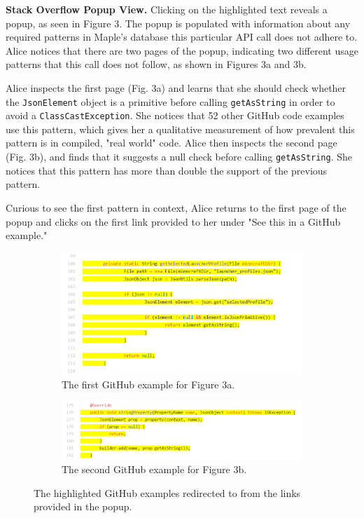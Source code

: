 {\bf Stack Overflow Popup View.}
Clicking on the highlighted text reveals a popup, as seen in Figure 3. The popup is populated with information about any required patterns in Maple's database this particular API call does not adhere to. Alice notices that there are two pages of the popup, indicating two different usage patterns that this call does not follow, as shown in Figures 3a and 3b. 

Alice inspects the first page (Fig. 3a) and learns that she should check whether the {\tt JsonElement} object is a primitive before calling {\tt getAsString} in order to avoid a {\tt ClassCastException}. She notices that 52 other GitHub code examples use this pattern, which gives her a qualitative measurement of how prevalent this pattern is in compiled, "real world" code.
Alice then inspects the second page (Fig. 3b), and finds that it suggests a null check before calling {\tt getAsString}. She notices that this pattern has more than double the support of the previous pattern.

Curious to see the first pattern in context, Alice returns to the first page of the popup and clicks on the first link provided to her under "See this in a GitHub example."

\begin{figure}
\centering
  \begin{subfigure}[a]{0.48\textwidth}
  \includegraphics[width=\textwidth]{json_primitive_gh1.PNG}
  \caption{The first GitHub example for Figure 3a.} 
  \vspace{.1in}
  \label{fig:arch}
  \end{subfigure}
  \hfill
  \begin{subfigure}[b]{0.48\textwidth}
  \includegraphics[width=\textwidth]{json_null_gh2.PNG}
  \caption{The second GitHub example for Figure 3b.}
  \vspace{.1in}
  \label{fig:arch}
  \end{subfigure}
  \hfill
\caption{The highlighted GitHub examples redirected to from the links provided in the popup.}
\end{figure}

